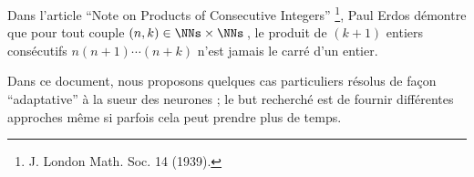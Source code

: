 Dans l'article \enquote{Note on Products of Consecutive Integers}
\footnote{
	J. London Math. Soc. 14 (1939).
},
Paul Erdos démontre que pour tout couple $(n, k) \in \NNs \times \NNs$\,, le produit de $(k+1)$ entiers consécutifs $n (n + 1) \cdots (n + k)$ n'est jamais le carré d'un entier. 

\medskip

Dans ce document, nous proposons quelques cas particuliers résolus de façon \enquote{adaptative} à la sueur des neurones ; le but recherché est de fournir différentes approches même si parfois cela peut prendre plus de temps.

